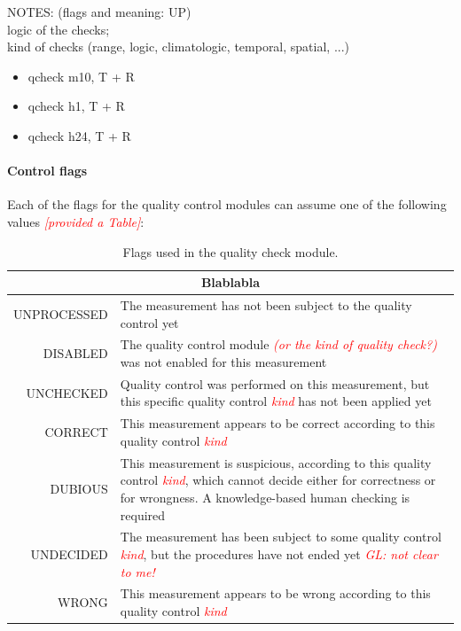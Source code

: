 \documentclass[authoryear,preprint,review,12pt]{elsarticle}
\newcommand{\note}[1]{\emph{\textcolor{red}{#1}}}
\begin{document}
NOTES: (flags and meaning: UP)\\
logic of the checks;\\
kind of checks (range, logic, climatologic, temporal, spatial, ...)

\begin{itemize}
    \item qcheck m10, T + R
    \item qcheck h1,  T + R
    \item qcheck h24, T + R
\end{itemize}


\paragraph{Control flags}\label{controlFlags} %
Each of the flags for the quality control modules can assume one of the following values \note{[provided a Table]}:
\begin{table}[]
    \begin{scriptsize}
    \centering
    \begin{tabular}{r|p{10cm}}
    \multicolumn{2}{c}{Blablabla} \\
    \hline
	UNPROCESSED & The measurement has not been subject to the quality control yet\\
	DISABLED & The quality control module \note{(or the kind of quality check?)} was not enabled for this measurement\\
	UNCHECKED & Quality control was performed on this measurement, but this specific quality control \note{kind} has not been applied yet\\
	CORRECT & This measurement appears to be correct according to this quality control \note{kind} \\
	DUBIOUS & This measurement is suspicious, according to this quality control \note{kind}, which cannot decide either for correctness or for wrongness. A knowledge-based human checking is required \\
	UNDECIDED & The measurement has been subject to some quality control \note{kind}, but the procedures have not ended yet \note{GL: not clear to me!}\\
	WRONG & This measurement appears to be wrong according to this quality control \note{kind} \\
    \end{tabular}
    \caption{Flags used in the quality check module.}
    \label{tab:flagsSummary}
    \end{scriptsize}
\end{table}
\end{document}

